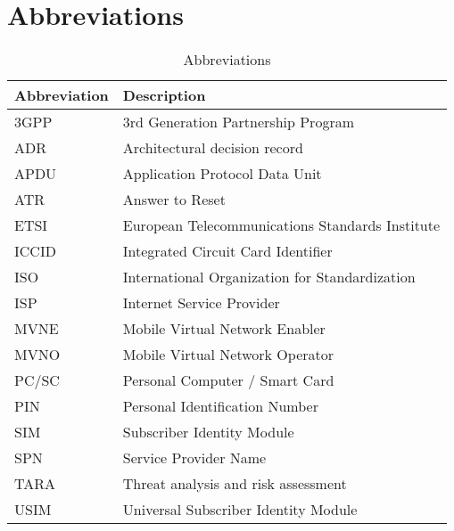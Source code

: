 
\chapter*{Abbreviations}

\begin{table}[ht!]
    \centering
    \caption{Abbreviations}
    \label{tab:abbreviations}
    \begin{tabular}{|l|l|}
        \hline
        \rowcolor{lightgray}
        \textbf{Abbreviation} & \textbf{Description}            \\ \hline
        3GPP  & 3rd Generation Partnership Program              \\ \hline
        ADR   & Architectural decision record                   \\ \hline
        APDU  & Application Protocol Data Unit                  \\ \hline
        ATR   & Answer to Reset                                 \\ \hline
        ETSI  & European Telecommunications Standards Institute \\ \hline
        ICCID & Integrated Circuit Card Identifier              \\ \hline
        ISO   & International Organization for Standardization  \\ \hline
        ISP   & Internet Service Provider                       \\ \hline
        MVNE  & Mobile Virtual Network Enabler                  \\ \hline
        MVNO  & Mobile Virtual Network Operator                 \\ \hline
        PC/SC & Personal Computer / Smart Card                  \\ \hline
        PIN   & Personal Identification Number                  \\ \hline
        SIM   & Subscriber Identity Module                      \\ \hline
        SPN   & Service Provider Name                           \\ \hline
        TARA  & Threat analysis and risk assessment             \\ \hline
        USIM  & Universal Subscriber Identity Module            \\ \hline
    \end{tabular}
\end{table}
